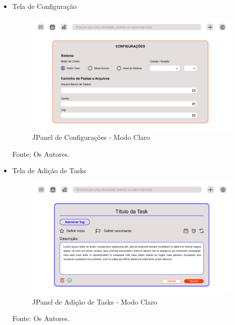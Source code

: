 \documentclass[a4paper,12pt]{article}
\begin{document}
\begin{itemize}
	\item Tela de Configuração
	\begin{figure}[H]
		\centering
		\includegraphics[scale=0.19]{prototypes/white/Config Panel Window.png}
		\caption{JPanel de Configurações - Modo Claro}
	\end{figure}
	\noindent Fonte: Os Autores.

	\pagebreak
	\item Tela de Adição de Tasks
	\begin{figure}[H]
		\centering
		\includegraphics[scale=0.19]{prototypes/white/Add Task Panel Window.png}
		\caption{JPanel de Adição de Tasks - Modo Claro}
	\end{figure}
	\noindent Fonte: Os Autores.


\end{itemize}
\end{document}
